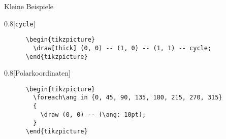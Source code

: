 \begin{frame}[fragile]{Kleine Beispiele}
  \begin{CodeExample}{0.8}[\texttt{cycle}]
    \begin{lstlisting}
      \begin{tikzpicture}
        \draw[thick] (0, 0) -- (1, 0) -- (1, 1) -- cycle;
      \end{tikzpicture}
    \end{lstlisting}
  \CodeResult
  \end{CodeExample}
  \begin{CodeExample}{0.8}[Polarkoordinaten]
    \begin{lstlisting}
      \begin{tikzpicture}
        \foreach\ang in {0, 45, 90, 135, 180, 215, 270, 315}
        {
          \draw (0, 0) -- (\ang: 10pt);
        }
      \end{tikzpicture}
    \end{lstlisting}
  \CodeResult
  \end{CodeExample}

\end{frame}
